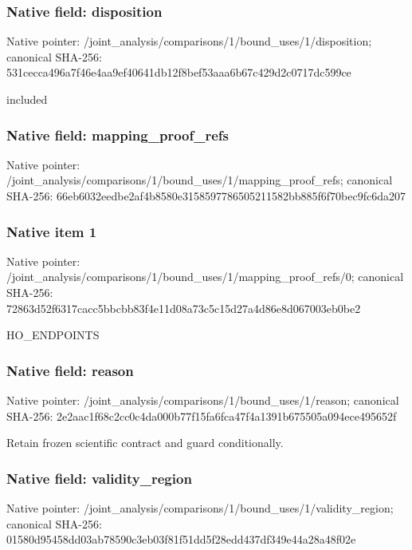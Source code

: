 \documentclass[10pt,a4paper]{article}
\begin{document}
\subsubsection{Native field: disposition}
Native pointer: /joint\_\allowbreak{}analysis/comparisons/1/bound\_\allowbreak{}uses/1/disposition; canonical SHA-256: 531cecca496a7f46e4aa9ef40641db12f8bef53aaa6b67c429d2c0717dc599ce

\begingroup\raggedright\sloppy included\par\endgroup

\subsubsection{Native field: mapping\_\allowbreak{}proof\_\allowbreak{}refs}
Native pointer: /joint\_\allowbreak{}analysis/comparisons/1/bound\_\allowbreak{}uses/1/mapping\_\allowbreak{}proof\_\allowbreak{}refs; canonical SHA-256: 66eb6032eedbe2af4b8580e3158597786505211582bb885f6f70bec9fc6da207

\subsubsection{Native item 1}
Native pointer: /joint\_\allowbreak{}analysis/comparisons/1/bound\_\allowbreak{}uses/1/mapping\_\allowbreak{}proof\_\allowbreak{}refs/0; canonical SHA-256: 72863d52f6317cacc5bbcbb83f4e11d08a73c5c15d27a4d86e8d067003eb0be2

\begingroup\raggedright\sloppy HO\_\allowbreak{}ENDPOINTS\par\endgroup

\subsubsection{Native field: reason}
Native pointer: /joint\_\allowbreak{}analysis/comparisons/1/bound\_\allowbreak{}uses/1/reason; canonical SHA-256: 2e2aac1f68c2cc0c4da000b77f15fa6fca47f4a1391b675505a094ece495652f

\begingroup\raggedright\sloppy Retain frozen scientific contract and guard conditionally.\par\endgroup

\subsubsection{Native field: validity\_\allowbreak{}region}
Native pointer: /joint\_\allowbreak{}analysis/comparisons/1/bound\_\allowbreak{}uses/1/validity\_\allowbreak{}region; canonical SHA-256: 01580d95458dd03ab78590c3eb03f81f51dd5f28edd437df349e44a28a48f02e
\end{document}
